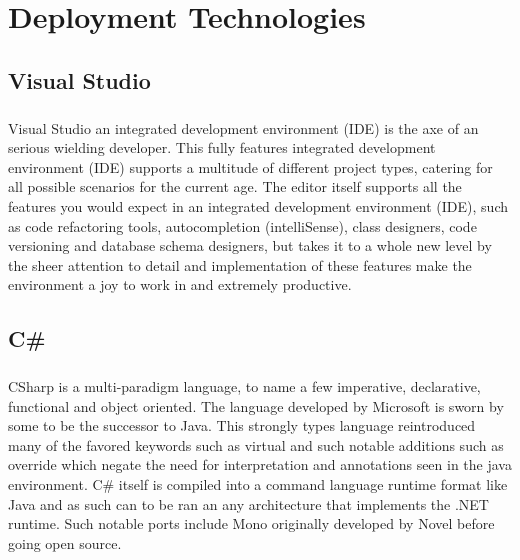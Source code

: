 \chapter{Deployment Technologies}
	\section{Visual Studio}
		\vspace{5mm}
	    \begin{multicols}{2}
		\paragraph{}
		
		Visual Studio an integrated development environment (IDE) is the axe of an serious wielding developer.
		This fully features integrated development environment (IDE) supports a multitude of different project types,
		catering for all possible scenarios for the current age.  The editor itself supports all the features you would expect in an 
		integrated development environment (IDE), such as code refactoring tools, autocompletion (intelliSense), 
		class designers, code versioning and database schema designers, but takes it to a whole new level by the sheer attention to detail and implementation of these features make the environment a joy to work in and extremely productive.    
			
		\end{multicols}
		
	\section{C\#}
		\vspace{5mm}
		\begin{multicols}{2}
		\paragraph{}
		
		CSharp is a multi-paradigm language, to name a few imperative, declarative, functional and object oriented.  
		The language developed by Microsoft is sworn by some to be the successor to Java.  This strongly types language
		reintroduced many of the favored keywords such as virtual and such notable additions such as override which negate
		the need for interpretation and annotations seen in the java environment.  C\# itself is compiled into a command language runtime format
		like Java and as such can to be ran an any architecture that implements the .NET runtime.  Such notable ports include Mono originally 
		developed by Novel before going open source.   

		\end{multicols}

